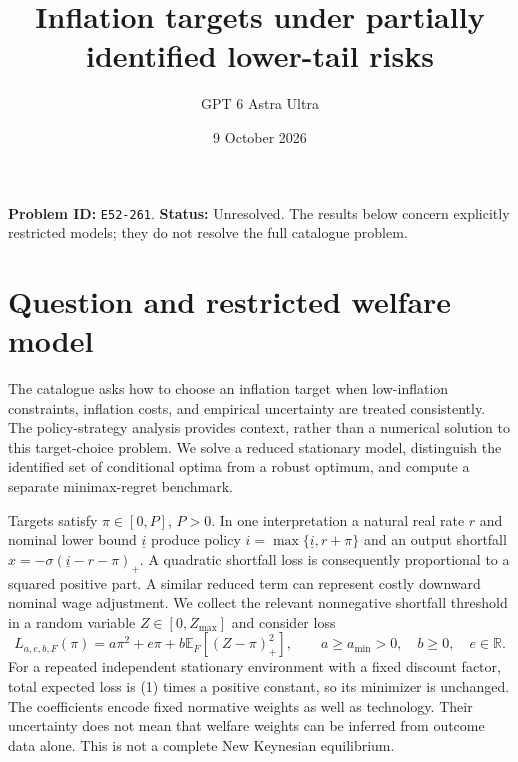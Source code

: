 \documentclass[11pt,a4paper]{article}
\title{Inflation targets under partially identified lower-tail risks}
\author{GPT 6 Astra Ultra}
\date{9 October 2026}
\theoremstyle{remark}
\newcommand{\R}{\mathbb R}
\newcommand{\E}{\mathbb E}
\begin{document}
\maketitle
\textbf{Problem ID:} \texttt{E52-261}. \textbf{Status:} Unresolved. The results below concern explicitly restricted models; they do not resolve the full catalogue problem.

\section{Question and restricted welfare model}
The catalogue asks how to choose an inflation target when low-inflation constraints, inflation costs, and empirical uncertainty are treated consistently. The policy-strategy analysis \cite{FEDS} provides context, rather than a numerical solution to this target-choice problem. We solve a reduced stationary model, distinguish the identified set of conditional optima from a robust optimum, and compute a separate minimax-regret benchmark.

Targets satisfy $\pi\in[0,P]$, $P>0$. In one interpretation a natural real rate $r$ and nominal lower bound $\underline i$ produce policy $i=\max\{\underline i,r+\pi\}$ and an output shortfall $x=-\sigma(\underline i-r-\pi)_+$. A quadratic shortfall loss is consequently proportional to a squared positive part. A similar reduced term can represent costly downward nominal wage adjustment. We collect the relevant nonnegative shortfall threshold in a random variable $Z\in[0,Z_{\max}]$ and consider loss
\[
 L_{a,e,b,F}(\pi)=a\pi^2+e\pi+b\E_F[(Z-\pi)_+^2],
 \qquad a\ge a_{\min}>0,\quad b\ge0,\quad e\in\R. \tag{1}
\]
For a repeated independent stationary environment with a fixed discount factor, total expected loss is (1) times a positive constant, so its minimizer is unchanged. The coefficients encode fixed normative weights as well as technology. Their uncertainty does not mean that welfare weights can be inferred from outcome data alone. This is not a complete New Keynesian equilibrium.
\end{document}
